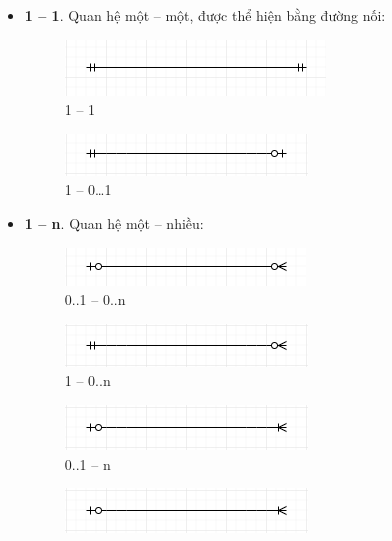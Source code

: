 \documentclass{article}
\begin{document}
  \begin{itemize}
    \item \textbf{1 -- 1}. Quan hệ một -- một, được thể hiện bằng đường nối:
    \begin{figure}[!ht]
      \centering
      \includegraphics[scale=1]{../pictures/diagrams/entityrelationship/1to1.PNG}
      \caption{1 -- 1}
    \end{figure}
    \begin{figure}[!ht]
      \centering
      \includegraphics[scale=1]{../pictures/diagrams/entityrelationship/1-mandatory-to-1-optional.PNG}
      \caption{1 -- 0\ldots 1}
    \end{figure}
    \item \textbf{1 -- n}. Quan hệ một -- nhiều:
    \begin{figure}[!ht]
      \centering
      \includegraphics[scale=1]{../pictures/diagrams/entityrelationship/1-optional-to-Many-optional.PNG}
      \caption{0..1 -- 0..n}
    \end{figure}
    \begin{figure}[!ht]
      \centering
      \includegraphics[scale=1]{../pictures/diagrams/entityrelationship/1-mandatory-to-Many-optional.PNG}
      \caption{1 -- 0..n}
    \end{figure}
    \begin{figure}[!ht]
      \centering
      \includegraphics[scale=1]{../pictures/diagrams/entityrelationship/1-optional-to-Many-mandatory.PNG}
      \caption{0..1 -- n}
    \end{figure}
    \begin{figure}[!ht]
      \centering
      \includegraphics[scale=1]{../pictures/diagrams/entityrelationship/1-optional-to-Many-mandatory.PNG}

\end{figure}
\end{itemize}
\end{document}
